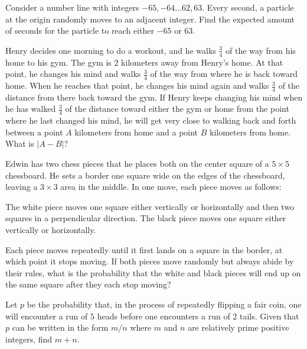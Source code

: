 \documentclass{article}
\begin{document}
\begin{req}[ART 2019/4]{4}
 Consider a number line with integers $-65,-64\dots 62,63.$ Every second, a particle at the origin randomly moves to an adjacent integer. Find the expected amount of seconds for the particle to reach either $-65$ or $63.$
\end{req}

\begin{prob}[AMC 10B 2019/18]{4}
Henry decides one morning to do a workout, and he walks $\tfrac{3}{4}$ of the way from his home to his gym. The gym is $2$ kilometers away from Henry's home. At that point, he changes his mind and walks $\tfrac{3}{4}$ of the way from where he is back toward home. When he reaches that point, he changes his mind again and walks $\tfrac{3}{4}$ of the distance from there back toward the gym. If Henry keeps changing his mind when he has walked $\tfrac{3}{4}$ of the distance toward either the gym or home from the point where he last changed his mind, he will get very close to walking back and forth between a point $A$ kilometers from home and a point $B$ kilometers from home. What is $|A-B|$?
\end{prob}

\begin{prob}[TMC 2020 10B/18]{4}
 Edwin has two chess pieces that he places both on the center square of a $5\times 5$ chessboard. He sets a border one square wide on the edges of the chessboard, leaving a $3\times 3$ area in the middle. In one move, each piece moves as follows:
    \begin{itemize}
\Item The white piece moves one square either vertically or horizontally and then two squares in a perpendicular direction.
\Item The black piece moves one square either vertically or horizontally.
\end{itemize}
Each piece moves repeatedly until it first lands on a square in the border, at which point it stops moving. If both pieces move randomly but always abide by their rules, what is the probability that the white and black pieces will end up on the same square after they each stop moving?
\end{prob}   

\begin{prob}[AIME 1995/15]{4}
 Let $p$ be the probability that, in the process of repeatedly flipping a fair coin, one will encounter a run of $5$ heads before one encounters a run of $2$ tails. Given that $p$ can be written in the form $m/n$ where $m$ and $n$ are relatively prime positive integers, find $m+n$.
\end{prob}
\end{document}
